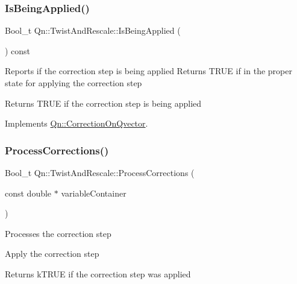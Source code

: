 \mbox{\label{classQn_1_1TwistAndRescale_a82b3138efce50ea788122dd26ca964d7}} 
\subsubsection{\texorpdfstring{Is\+Being\+Applied()}{IsBeingApplied()}}
{\footnotesize\ttfamily Bool\+\_\+t Qn\+::\+Twist\+And\+Rescale\+::\+Is\+Being\+Applied (\begin{DoxyParamCaption}{ }\end{DoxyParamCaption}) const\hspace{0.3cm}{\ttfamily [virtual]}}

Reports if the correction step is being applied Returns T\+R\+UE if in the proper state for applying the correction step \begin{DoxyReturn}{Returns}
T\+R\+UE if the correction step is being applied 
\end{DoxyReturn}


Implements \mbox{\hyperlink{classQn_1_1CorrectionOnQvector_a4d47a1c241b4bfd5ac98d6fdbc90eb79}{Qn\+::\+Correction\+On\+Qvector}}.

\mbox{\label{classQn_1_1TwistAndRescale_a3bc16721deb0f73dbfcf0ae6cabe5b54}} 
\subsubsection{\texorpdfstring{Process\+Corrections()}{ProcessCorrections()}}
{\footnotesize\ttfamily Bool\+\_\+t Qn\+::\+Twist\+And\+Rescale\+::\+Process\+Corrections (\begin{DoxyParamCaption}\item[{const double $\ast$}]{variable\+Container }\end{DoxyParamCaption})\hspace{0.3cm}{\ttfamily [virtual]}}

Processes the correction step

Apply the correction step \begin{DoxyReturn}{Returns}
k\+T\+R\+UE if the correction step was applied 
\end{DoxyReturn}


